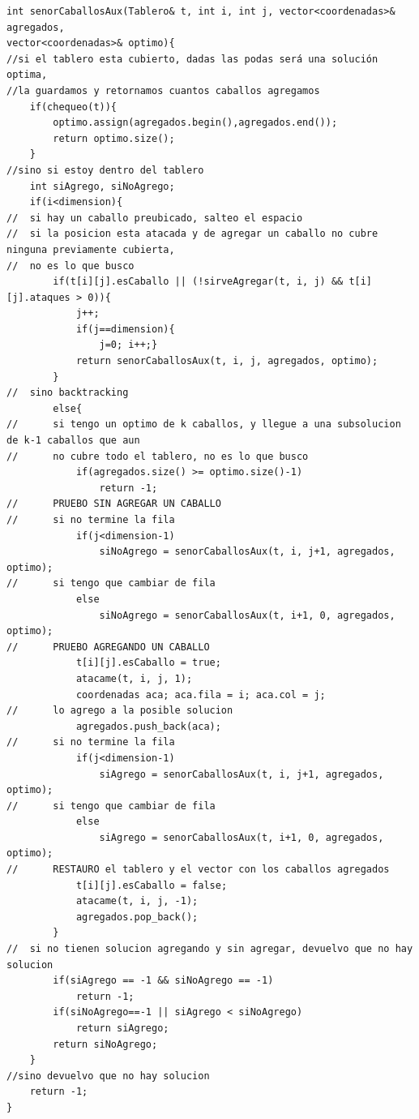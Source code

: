 	\begin{codesnippet}
	\begin{verbatim}
int senorCaballosAux(Tablero& t, int i, int j, vector<coordenadas>& agregados, 
vector<coordenadas>& optimo){
//si el tablero esta cubierto, dadas las podas será una solución optima, 
//la guardamos y retornamos cuantos caballos agregamos
    if(chequeo(t)){        
        optimo.assign(agregados.begin(),agregados.end());
        return optimo.size();
    }
//sino si estoy dentro del tablero
    int siAgrego, siNoAgrego;
    if(i<dimension){
//  si hay un caballo preubicado, salteo el espacio
//  si la posicion esta atacada y de agregar un caballo no cubre ninguna previamente cubierta, 
//  no es lo que busco
        if(t[i][j].esCaballo || (!sirveAgregar(t, i, j) && t[i][j].ataques > 0)){
            j++;
            if(j==dimension){
                j=0; i++;}
            return senorCaballosAux(t, i, j, agregados, optimo);
        }
//  sino backtracking
        else{
//      si tengo un optimo de k caballos, y llegue a una subsolucion de k-1 caballos que aun 
//      no cubre todo el tablero, no es lo que busco
            if(agregados.size() >= optimo.size()-1)
                return -1;
//      PRUEBO SIN AGREGAR UN CABALLO
//      si no termine la fila
            if(j<dimension-1)
                siNoAgrego = senorCaballosAux(t, i, j+1, agregados, optimo);
//      si tengo que cambiar de fila
            else
                siNoAgrego = senorCaballosAux(t, i+1, 0, agregados, optimo);
//      PRUEBO AGREGANDO UN CABALLO
            t[i][j].esCaballo = true;
            atacame(t, i, j, 1);
            coordenadas aca; aca.fila = i; aca.col = j;
//      lo agrego a la posible solucion
            agregados.push_back(aca);
//      si no termine la fila
            if(j<dimension-1)
                siAgrego = senorCaballosAux(t, i, j+1, agregados, optimo);
//      si tengo que cambiar de fila
            else
                siAgrego = senorCaballosAux(t, i+1, 0, agregados, optimo);
//      RESTAURO el tablero y el vector con los caballos agregados
            t[i][j].esCaballo = false;
            atacame(t, i, j, -1);
            agregados.pop_back();
        }
//  si no tienen solucion agregando y sin agregar, devuelvo que no hay solucion
        if(siAgrego == -1 && siNoAgrego == -1)
            return -1;
        if(siNoAgrego==-1 || siAgrego < siNoAgrego)
            return siAgrego;
        return siNoAgrego;
    }
//sino devuelvo que no hay solucion
    return -1;
}
	\end{verbatim}
	\end{codesnippet}

